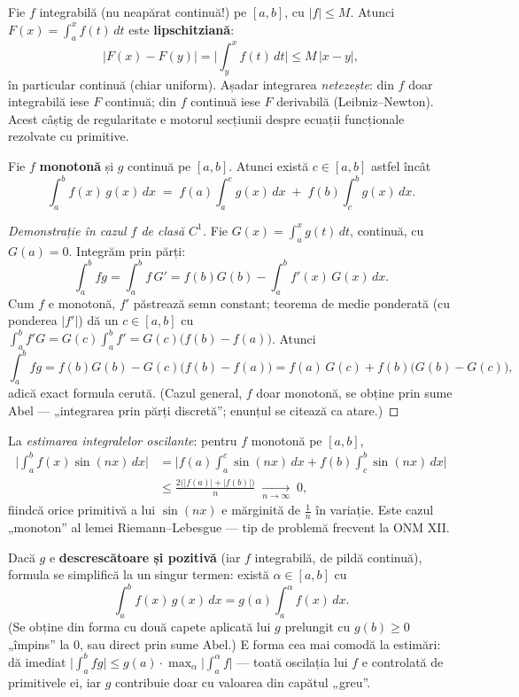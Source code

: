 \begin{teorema}
Fie $f$ integrabilă (nu neapărat continuă!) pe $[a,b]$, cu $|f|\le M$. Atunci $F(x)=\displaystyle\int_a^x f(t)\,dt$ este \textbf{lipschitziană}:
\[
|F(x)-F(y)|=\Big|\int_y^x f(t)\,dt\Big|\le M\,|x-y|,
\]
în particular continuă (chiar uniform). Așadar integrarea \emph{netezește}: din $f$ doar integrabilă iese $F$ continuă; din $f$ continuă iese $F$ derivabilă (Leibniz--Newton). Acest câștig de regularitate e motorul secțiunii despre ecuații funcționale rezolvate cu primitive.
\end{teorema}

\begin{teorema}
Fie $f$ \textbf{monotonă} și $g$ continuă pe $[a,b]$. Atunci există $c\in[a,b]$ astfel încât
\[
\int_a^b f(x)\,g(x)\,dx\;=\;f(a)\int_a^{c}g(x)\,dx\;+\;f(b)\int_{c}^{b}g(x)\,dx.
\]
\end{teorema}
\begin{proof}[Demonstrație în cazul $f$ de clasă $C^1$]
Fie $G(x)=\int_a^x g(t)\,dt$, continuă, cu $G(a)=0$. Integrăm prin părți:
\[
\int_a^b fg=\int_a^b f\,G'=f(b)G(b)-\int_a^b f'(x)\,G(x)\,dx.
\]
Cum $f$ e monotonă, $f'$ păstrează semn constant; teorema de medie ponderată (cu ponderea $|f'|$) dă un $c\in[a,b]$ cu
$\int_a^b f'G=G(c)\int_a^b f'=G(c)\big(f(b)-f(a)\big)$. Atunci
\[
\int_a^b fg=f(b)G(b)-G(c)\big(f(b)-f(a)\big)=f(a)\,G(c)+f(b)\big(G(b)-G(c)\big),
\]
adică exact formula cerută. (Cazul general, $f$ doar monotonă, se obține prin sume Abel --- „integrarea prin părți discretă''; enunțul se citează ca atare.)
\end{proof}

\begin{obs}
La \emph{estimarea integralelor oscilante}: pentru $f$ monotonă pe $[a,b]$,
\[
\begin{aligned}
\Big|\int_a^b f(x)\sin(nx)\,dx\Big|
&=\Big|f(a)\int_a^c\sin(nx)\,dx+f(b)\int_c^b\sin(nx)\,dx\Big|\\
&\le\frac{2\big(|f(a)|+|f(b)|\big)}{n}\;\xrightarrow[n\to\infty]{}\;0,
\end{aligned}
\]
fiindcă orice primitivă a lui $\sin(nx)$ e mărginită de $\frac1n$ în variație. Este cazul „monoton'' al lemei Riemann--Lebesgue --- tip de problemă frecvent la ONM XII.
\end{obs}

\begin{obs}
Dacă $g$ e \textbf{descrescătoare și pozitivă} (iar $f$ integrabilă, de pildă continuă), formula se simplifică la un singur termen: există $\alpha\in[a,b]$ cu
\[
\int_a^b f(x)\,g(x)\,dx=g(a)\int_a^{\alpha}f(x)\,dx.
\]
(Se obține din forma cu două capete aplicată lui $g$ prelungit cu $g(b)\ge0$ „împins'' la $0$, sau direct prin sume Abel.) E forma cea mai comodă la estimări: dă imediat
$\big|\int_a^b fg\big|\le g(a)\cdot\max_{\alpha}\big|\int_a^{\alpha}f\big|$ --- toată oscilația lui $f$ e controlată de primitivele ei, iar $g$ contribuie doar cu valoarea din capătul „greu''.
\end{obs}

